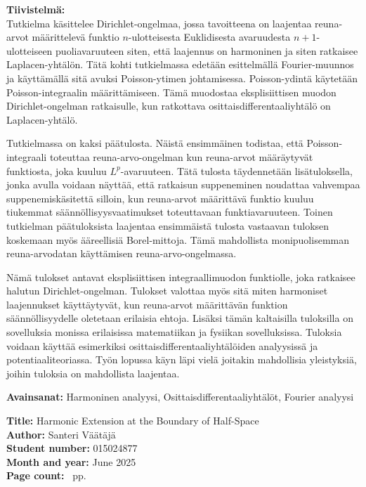 \documentclass[a4paper, 11pt]{report}
\theoremstyle{plain}
\theoremstyle{definition}
\theoremstyle{remark}
\begin{document}
\noindent\textbf{Tiivistelmä:}\\ %
Tutkielma käsittelee Dirichlet-ongelmaa, jossa tavoitteena on laajentaa reuna-arvot määrittelevä funktio $n$-ulotteisesta Euklidisesta avaruudesta $n+1$-ulotteiseen puoliavaruuteen siten, että laajennus on harmoninen ja siten ratkaisee Laplacen-yhtälön. Tätä kohti tutkielmassa edetään esittelmällä Fourier-muunnos ja käyttämällä sitä avuksi Poisson-ytimen johtamisessa. Poisson-ydintä käytetään Poisson-integraalin määrittämiseen. Tämä muodostaa eksplisiittisen muodon Dirichlet-ongelman ratkaisulle, kun ratkottava osittaisdifferentaaliyhtälö on Laplacen-yhtälö.

Tutkielmassa on kaksi päätulosta. Näistä ensimmäinen todistaa, että Poisson-integraali toteuttaa reuna-arvo-ongelman kun reuna-arvot määräytyvät funktiosta, joka kuuluu $L^p$-avaruuteen. Tätä tulosta täydennetään lisätuloksella, jonka avulla voidaan näyttää, että ratkaisun suppeneminen noudattaa vahvempaa suppenemiskäsitettä silloin, kun reuna-arvot määrittävä funktio kuuluu tiukemmat säännöllisyysvaatimukset toteuttavaan funktiavaruuteen. Toinen tutkielman päätuloksista laajentaa ensimmäistä tulosta vastaavan tuloksen koskemaan myös ääreellisiä Borel-mittoja. Tämä mahdollista monipuolisemman reuna-arvodatan käyttämisen reuna-arvo-ongelmassa.

Nämä tulokset antavat eksplisiittisen integraallimuodon funktiolle, joka ratkaisee halutun Dirichlet-ongelman. Tulokset valottaa myös sitä miten harmoniset laajennukset käyttäytyvät, kun reuna-arvot määrittävän funktion säännöllisyydelle oletetaan erilaisia ehtoja. Lisäksi tämän kaltaisilla tuloksilla on sovelluksia monissa erilaisissa matematiikan ja fysiikan sovelluksissa. Tuloksia voidaan käyttää esimerkiksi osittaisdifferentaaliyhtälöiden analyysissä ja potentiaaliteoriassa. Työn lopussa käyn läpi vielä joitakin mahdollisia yleistyksiä, joihin tuloksia on mahdollista laajentaa.

\vfill

\noindent\textbf{Avainsanat:} Harmoninen analyysi, Osittaisdifferentaaliyhtälöt, Fourier analyysi %

\clearpage
\noindent\textbf{Title:} Harmonic Extension at the Boundary of Half-Space\\ %
\textbf{Author:} Santeri Väätäjä\\ %
\textbf{Student number:} 015024877 \\
\textbf{Month and year:} June 2025\\ %
\textbf{Page count:} \pageref*{LastPage}~pp.\\[1em] %
\end{document}
